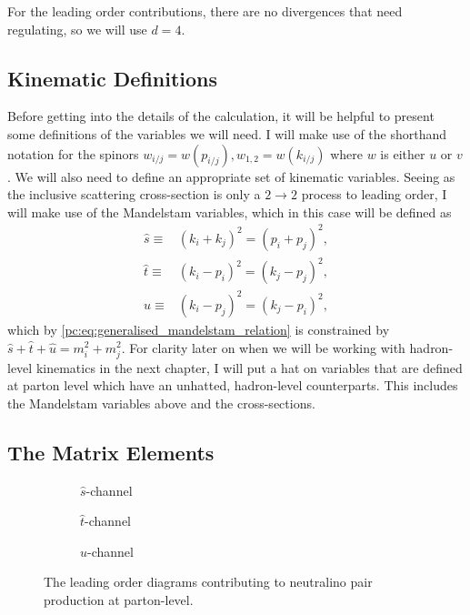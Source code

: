 \documentclass[../main.tex]{subfiles}
\begin{document}
For the leading order contributions, there are no divergences that need regulating, so we will use \(d=4\).

\subsection{Kinematic Definitions}
Before getting into the details of the calculation, it will be helpful to present some definitions of the variables we will need.
I will make use of the shorthand notation for the spinors \(w_{i/j} = w(p_{i/j}), w_{1,2} = w(k_{i/j})\) where \(w\) is either \(u\) or \(v\).
We will also need to define an appropriate set of kinematic variables.
Seeing as the inclusive scattering cross-section is only a \(2 \to 2\) process to leading order, I will make use of the Mandelstam variables, which in this case will be defined as
\begin{subequations}
  \label{pc:eq:mandelstam_LO}
  \begin{align}
    \hat{s} \equiv & (k_i+k_j)^2 = (p_i+p_j)^2, \\
    \hat{t} \equiv & (k_i-p_i)^2 = (k_j-p_j)^2, \\
    \hat{u} \equiv & (k_i-p_j)^2 = (k_j-p_i)^2,
  \end{align}
\end{subequations}
which by \cref{pc:eq:generalised_mandelstam_relation} is constrained by \(\hat{s} + \hat{t} + \hat{u} = m_i^2 + m_j^2\).
For clarity later on when we will be working with hadron-level kinematics in the next chapter, I will put a hat on variables that are defined at parton level which have an unhatted, hadron-level counterparts.
This includes the Mandelstam variables above and the cross-sections.


\subsection{The Matrix Elements}
\begin{figure} [ht!]
  \centering
  \begin{subfigure}{0.3\linewidth}
    \centering
    \caption{\(\hat{s}\)-channel}
  \end{subfigure}
  \begin{subfigure}{0.3\linewidth}
    \centering
    \caption{\(\hat{t}\)-channel}
  \end{subfigure}
  \begin{subfigure}{0.3\linewidth}
    \centering
    \caption{\(\hat{u}\)-channel}
  \end{subfigure}
  \caption{The leading order diagrams contributing to neutralino pair
    production at parton-level.}
  \label{pc:fig:tree_level_diagrams}
\end{figure}
\end{document}
